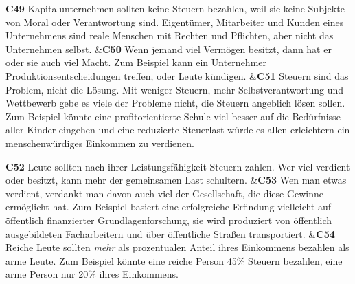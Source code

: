 \documentclass[
		11pt,
		a4paper,
		openright,
		oneside,
		ngerman
	]
	{book}
\begin{document}
\begin{longtabu}[htpb]
\textbf{C49} %
		Kapitalunternehmen sollten keine Steuern bezahlen, weil sie keine Subjekte von Moral oder Verantwortung sind.
		Eigentümer, Mitarbeiter und Kunden eines Unternehmens sind reale Menschen mit Rechten und Pflichten, aber nicht das Unternehmen selbst.
&\textbf{C50}
		Wenn jemand viel Vermögen besitzt, dann hat er oder sie auch viel Macht.
		Zum Beispiel kann ein Unternehmer Produktionsentscheidungen treffen, oder Leute kündigen.
&\textbf{C51} %
		Steuern sind das Problem, nicht die Lösung.
		Mit weniger Steuern, mehr Selbstverantwortung und Wettbewerb gebe es viele der Probleme nicht, die Steuern angeblich lösen sollen.
		Zum Beispiel könnte eine profitorientierte Schule viel besser auf die Bedürfnisse aller Kinder eingehen und eine reduzierte Steuerlast würde es allen erleichtern ein menschenwürdiges Einkommen zu verdienen.
\\

\midrule

\textbf{C52} %
		Leute sollten nach ihrer Leistungsfähigkeit Steuern zahlen.
		Wer viel verdient oder besitzt, kann mehr der gemeinsamen Last schultern.
&\textbf{C53} %
		Wen man etwas verdient, verdankt man davon auch viel der Gesellschaft, die diese Gewinne ermöglicht hat.
		Zum Beispiel basiert eine erfolgreiche Erfindung vielleicht auf öffentlich finanzierter Grundlagenforschung, sie wird produziert von öffentlich ausgebildeten Facharbeitern und über öffentliche Straßen transportiert.
&\textbf{C54} %
		Reiche Leute sollten \emph{mehr} als prozentualen Anteil ihres Einkommens bezahlen als arme Leute.
		Zum Beispiel könnte eine reiche Person 45\% Steuern bezahlen, eine arme Person nur 20\% ihres Einkommens.
\\


\end{longtabu}
\end{document}
